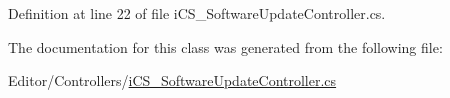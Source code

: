 Definition at line 22 of file i\+C\+S\+\_\+\+Software\+Update\+Controller.\+cs.



The documentation for this class was generated from the following file\+:\begin{DoxyCompactItemize}
\item 
Editor/\+Controllers/\hyperlink{i_c_s___software_update_controller_8cs}{i\+C\+S\+\_\+\+Software\+Update\+Controller.\+cs}\end{DoxyCompactItemize}
